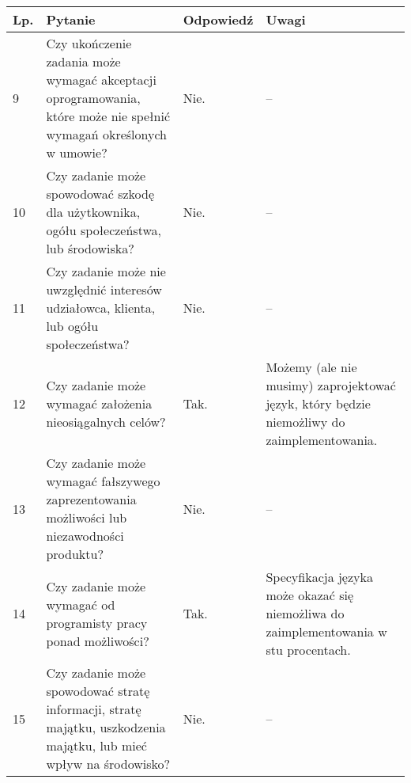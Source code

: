 \documentclass[11pt,oneside,a4paper,titlepage,onecolumn]{article}
\begin{document}
\begin{tabularx}{\textwidth}{|l|X|l|X|}
    \hline
    Lp. & Pytanie & Odpowiedź & Uwagi \\ \hline

	9
	& Czy ukończenie zadania może wymagać akceptacji oprogramowania, które może
    nie spełnić wymagań określonych w umowie?
	& Nie.
	& --
	\\\hline

	10
	& Czy zadanie może spowodować szkodę dla użytkownika, ogółu społeczeństwa, lub
    środowiska?
	& Nie.
	& --
	\\\hline

	11
	& Czy zadanie może nie uwzględnić interesów udziałowca, klienta, lub ogółu
    społeczeństwa?
	& Nie.
	& --
	\\\hline

	12
	& Czy zadanie może wymagać założenia nieosiągalnych celów?
	& Tak.
    & Możemy (ale nie musimy) zaprojektować język, który będzie niemożliwy do
    zaimplementowania.
	\\\hline

	13
	& Czy zadanie może wymagać fałszywego zaprezentowania możliwości lub
    niezawodności produktu?
	& Nie.
	& --
	\\\hline

	14
	& Czy zadanie może wymagać od programisty pracy ponad możliwości?
	& Tak.
	& Specyfikacja języka może okazać się niemożliwa do zaimplementowania w stu
    procentach.
	\\\hline

	15
	& Czy zadanie może spowodować stratę informacji, stratę majątku, uszkodzenia
    majątku, lub mieć wpływ na środowisko?
	& Nie.
	& --
	\\\hline
\end{tabularx}
\end{document}
